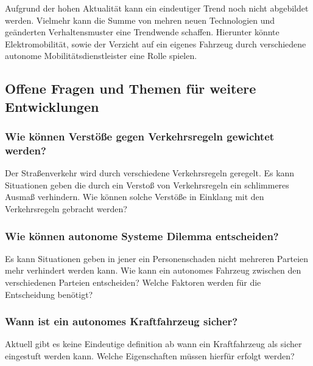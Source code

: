 Aufgrund der hohen Aktualität kann ein eindeutiger Trend noch nicht abgebildet werden.
Vielmehr kann die Summe von mehren neuen Technologien und geänderten Verhaltensmuster eine Trendwende schaffen.
Hierunter könnte Elektromobilität, sowie der Verzicht auf ein eigenes Fahrzeug durch verschiedene
autonome Mobilitätsdienstleister eine Rolle spielen.

\subsection{Offene Fragen und Themen für weitere Entwicklungen}
\subsubsection{Wie können Verstöße gegen Verkehrsregeln gewichtet werden?}

Der Straßenverkehr wird durch verschiedene Verkehrsregeln geregelt.
Es kann Situationen geben die durch ein Verstoß von Verkehrsregeln ein
schlimmeres Ausmaß verhindern.
Wie können solche Verstöße in Einklang mit den Verkehrsregeln gebracht werden?

\subsubsection{Wie können autonome Systeme Dilemma entscheiden?}
Es kann Situationen geben in jener ein Personenschaden nicht mehreren Parteien mehr verhindert werden kann.
Wie kann ein autonomes Fahrzeug zwischen den verschiedenen Parteien entscheiden?
Welche Faktoren werden für die Entscheidung benötigt?

\subsubsection{Wann ist ein autonomes Kraftfahrzeug sicher?}
Aktuell gibt es keine Eindeutige definition ab wann ein Kraftfahrzeug als sicher eingestuft werden kann.
Welche Eigenschaften müssen hierfür erfolgt werden?